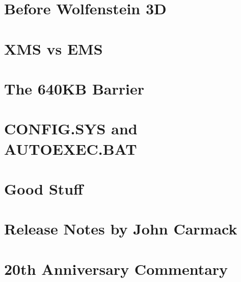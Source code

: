 \documentclass[8pt]{book}
\begin{document}
        \appendix
    \appendixpage

\chapter{Before Wolfenstein 3D}
        
    
    \chapter{XMS vs EMS} 
          
    \chapter{The 640KB Barrier}\label{chap:barrier640}
        
    \chapter{CONFIG.SYS and AUTOEXEC.BAT}
         
    \chapter{Good Stuff}
          
    \chapter{Release Notes by John Carmack}
        
    \chapter{20th Anniversary Commentary}
        

    
    \cleartoleftpage %
    
    \blankpage
    \blankpage
\end{document}
